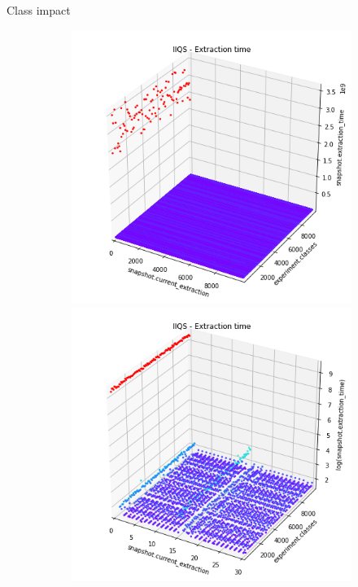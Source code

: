 \documentclass{beamer}
\begin{document}
\begin{frame}{Class impact}
    \begin{figure}
        \centering
        \begin{subfigure}[b]{\textwidth}
            \centering
            \includegraphics[height=0.6\textheight]{chapter4/01-basebenchmark-05-classes.png.0-1.png}
            \includegraphics[height=0.6\textheight]{chapter4/01-basebenchmark-05-classes.png.0-2.png}

\end{subfigure}
\end{figure}
\end{frame}
\end{document}
